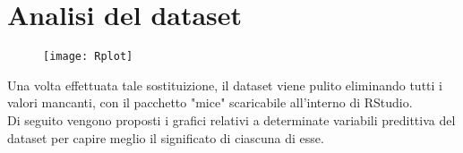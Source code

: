 \section{Analisi del dataset}


\begin{figure}[H]
	\centering
	\texttt{[image: Rplot]}
\end{figure}

Una volta effettuata tale sostituizione, il dataset viene pulito eliminando tutti i valori mancanti, con il pacchetto "mice" scaricabile all'interno di RStudio.\\

Di seguito vengono proposti i grafici relativi a determinate variabili predittiva del dataset per capire meglio il significato di ciascuna di esse.











